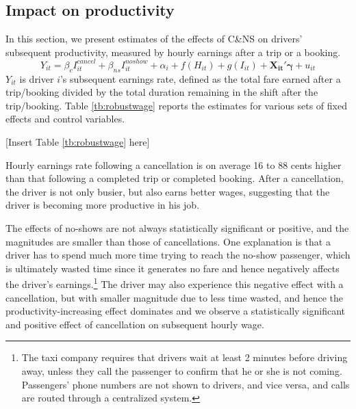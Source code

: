 \documentclass[reviewmode]{restat}
\begin{document}
\subsection{Impact on productivity}
In this section, we present estimates of the effects of C\&NS on drivers' subsequent productivity,
measured by hourly earnings after a trip or a booking.
\begin{equation}
\label{eq:outcomes}
Y_{it} = \beta_c I^{cancel}_{it} + \beta_{ns} I^{noshow}_{it} + \alpha_i + f(H_{it}) + g(I_{it}) + \mathbf{X_{it}}'\mathbf{\gamma}  + u_{it}
\end{equation}
$Y_{it}$ is driver $i$'s subsequent earnings rate, defined as the total fare earned after a trip/booking 
divided by the total duration remaining in the shift after the trip/booking. Table \ref{tb:robustwage} 
reports the estimates for various sets of fixed effects and control variables.

\begin{center}
	[Insert Table \ref{tb:robustwage} here]
\end{center}

Hourly earnings rate following a cancellation is on average 16 to 88 cents higher than that following a 
completed trip or completed booking. After a cancellation, the driver is not only busier, but also earns
better wages, suggesting that the driver is becoming more productive in his job. 

The effects of no-shows are not always statistically significant or positive, and the magnitudes are smaller
than those of cancellations. One explanation is that a driver has to spend much more time trying to reach
the no-show passenger, which is ultimately wasted time since it generates no fare and hence negatively 
affects the driver's earnings.\footnote{The taxi company requires that drivers wait at least 2 minutes 
before driving away, unless they call the passenger to confirm that he or she is not coming. Passengers' 
phone numbers are not shown to drivers, and vice versa, and calls are routed through a centralized system.}
The driver may also experience this negative effect with a cancellation, but with smaller magnitude due to 
less time wasted, and hence the productivity-increasing effect dominates and we observe a statistically
significant and positive effect of cancellation on subsequent hourly wage.
\end{document}
